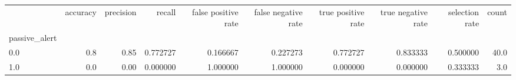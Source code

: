 \begin{tabular}{lrrrrrrrrr}
\toprule
{} &  accuracy &  precision &    recall &  false positive rate &  false negative rate &  true positive rate &  true negative rate &  selection rate &  count \\
passive\_alert &           &            &           &                      &                      &                     &                     &                 &        \\
\midrule
0.0           &       0.8 &       0.85 &  0.772727 &             0.166667 &             0.227273 &            0.772727 &            0.833333 &        0.500000 &   40.0 \\
1.0           &       0.0 &       0.00 &  0.000000 &             1.000000 &             1.000000 &            0.000000 &            0.000000 &        0.333333 &    3.0 \\
\bottomrule
\end{tabular}
